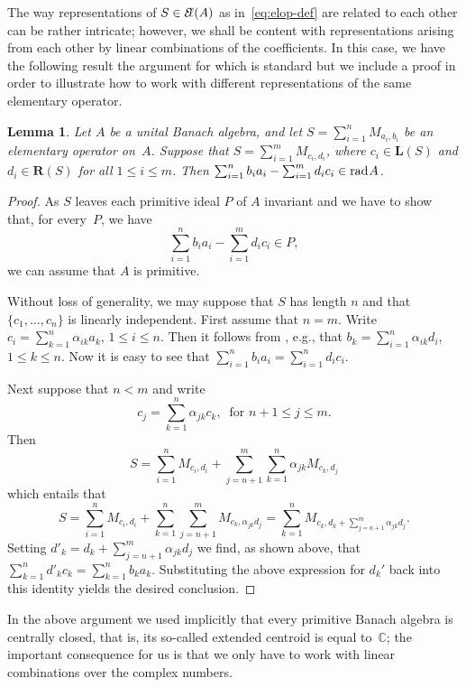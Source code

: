 \documentclass[a4paper,12pt,reqno]{amsart}
\numberwithin{equation}{section}
\newtheorem{lem}[thm]{Lemma}
\theoremstyle{definition}
\begin{document}
The way representations of $S\in{{\mathcal{E}\kern-2.6pt\ell(A)}}$ as in~\eqref{eq:elop-def} are related to each other can be rather intricate;
however, we shall be content with representations arising from each other by linear combinations of the coefficients.
In this case, we have the following result the argument for which is standard but we include a proof in order to illustrate how to work with
different representations of the same elementary operator.
\begin{lem}\label{lem:various-repns}
Let $A$ be a unital Banach algebra,  and let ${S} =\sum_{i=1}^n M_{a_i, b_i}$ be an elementary operator on~$A$.
Suppose that ${S}= \sum_{i=1}^m M_{c_i, d_i}$, where $c_i \in {{\bm L(S)}}$ and $ d_i \in {{\bm R(S)}}$ for all $1 \leq i \leq m$.
Then $\sum_{i=1}^n b_i a_i - \sum_{i=1}^m d_i c_i \in {{\textup{rad}\kern.7pt A}}$.
\end{lem}
\begin{proof}
As ${S}$ leaves each primitive ideal $P$ of $A$ invariant and we have to show that, for every~$P$, we have
\[
\sum_{i=1}^n b_i a_i - \sum_{i=1}^m d_i c_i \in P,
\]
we can  assume that $A$ is primitive.

Without loss of generality, we may suppose that ${S}$ has length $n$ and that $\{c_1,\ldots,  c_n\}$ is linearly independent.
First assume that $n=m$. Write $c_i= \sum_{k=1}^n \alpha_{ik} a_k$, $1\leq i\leq n$. Then it follows from \cite[Theorem 5.1.7]{ArMa}, e.g.,
that $b_k= \sum_{i=1}^n \alpha_{ik} d_i$, $1\leq k\leq n$. Now it is easy to see that $\sum_{i=1}^n b_i a_i= \sum_{i=1}^n d_i c_i$.

Next suppose that $n <m$ and write
\begin{equation*}
c_j= \sum_{k=1}^n \alpha_{jk} c_k, \;\; \text {for } n+1 \leq j  \leq m.
\end{equation*}
Then
\begin{equation*}
{S}= \sum_{i=1}^n M_{c_i, d_i}+ \sum_{j=n+1}^m \sum_{k=1}^n  \alpha_{jk}M_{c_k, d_j}
\end{equation*}
which entails that
\begin{equation*}
{S}   = \sum_{i=1}^n M_{c_i,d_i}+ \sum_{k=1}^n \sum_{j=n+1}^m  M_{c_k, \alpha_{jk}d_j}
           = \sum_{k=1}^n M_{c_k,d_k+\sum\limits_{j=n+1}^m\!\alpha_{jk} d_j}.
\end{equation*}
Setting $d'_k= d_k+\sum_{j=n+1}^m \alpha_{jk}d_j$ we find, as shown above, that
$\sum_{k=1}^n d'_k c_k= \sum_{k=1}^n b_ka_k$.
Substituting the above expression for $d_k'$ back into this identity yields the desired conclusion.
\end{proof}
In the above argument we used implicitly that every primitive Banach algebra is centrally closed,
that is, its so-called extended centroid is equal to~${\mathbb{C}}$; the important consequence for us is that
we only have to work with linear combinations over the complex numbers.
\end{document}
